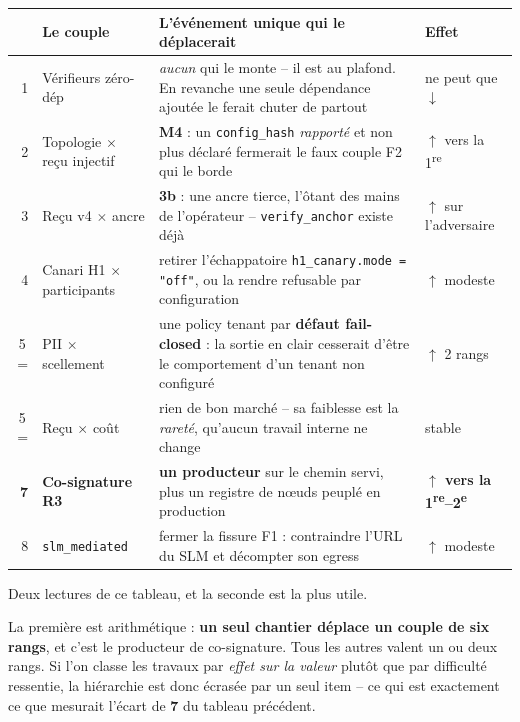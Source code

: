 \documentclass[10pt]{article}
\newcommand{\best}[1]{{\color{green}\textbf{#1}}}
\newcommand{\pire}[1]{{\color{red}\textbf{#1}}}
\newcommand{\sz}[1]{{\small\color{grey}\textsf{#1}}}
\newcommand{\code}[1]{\texttt{\small #1}}
\newcommand{\x}{$\times$}
\newcommand{\hausse}{{\color{green}$\uparrow$}}
\newcommand{\baisse}{{\color{red}$\downarrow$}}
\begin{document}
\renewcommand{\arraystretch}{1.2}
\begin{center}\small
\begin{tabular}{@{}r >{\raggedright\arraybackslash}p{4.6cm} >{\raggedright\arraybackslash}p{7.1cm} >{\raggedright\arraybackslash}p{3.5cm}@{}}
\toprule
& \textbf{Le couple} & \textbf{L'événement unique qui le déplacerait} & \textbf{Effet} \\
\midrule
1 & Vérifieurs zéro-dép & \emph{aucun} qui le monte -- il est au plafond. En revanche une seule
  dépendance ajoutée le ferait chuter de partout & \sz{ne peut que} \baisse \\
2 & Topologie \x{} reçu injectif & \textbf{M4} : un \code{config\_hash} \emph{rapporté} et non plus
  déclaré fermerait le faux couple F2 qui le borde & \hausse{} \sz{vers la 1\textsuperscript{re}} \\
3 & Reçu v4 \x{} ancre & \textbf{3b} : une ancre tierce, l'ôtant des mains de l'opérateur --
  \code{verify\_anchor} existe déjà & \hausse{} \sz{sur l'adversaire} \\
4 & Canari H1 \x{} participants & retirer l'échappatoire \code{h1\_canary.mode = "off"}, ou la rendre
  refusable par configuration & \hausse{} \sz{modeste} \\
5\,= & PII \x{} scellement & une policy tenant par \textbf{défaut fail-closed} : la sortie en clair
  cesserait d'être le comportement d'un tenant non configuré & \hausse{} \sz{2 rangs} \\
5\,= & Reçu \x{} coût & rien de bon marché -- sa faiblesse est la \emph{rareté}, qu'aucun travail
  interne ne change & \sz{stable} \\
\textbf{7} & \textbf{Co-signature R3} & \textbf{un producteur} sur le chemin servi, plus un registre
  de n\oe uds peuplé en production & \best{\hausse{} vers la 1\textsuperscript{re}--2\textsuperscript{e}} \\
8 & \code{slm\_mediated} & fermer la fissure F1 : contraindre l'URL du SLM et décompter son egress
  & \hausse{} \sz{modeste} \\
\bottomrule
\end{tabular}
\end{center}

Deux lectures de ce tableau, et la seconde est la plus utile.

La première est arithmétique : \textbf{un seul chantier déplace un couple de six rangs}, et c'est le
producteur de co-signature. Tous les autres valent un ou deux rangs. Si l'on classe les travaux par
\emph{effet sur la valeur} plutôt que par difficulté ressentie, la hiérarchie est donc écrasée par un
seul item -- ce qui est exactement ce que mesurait l'écart de \pire{7} du tableau précédent.
\end{document}
